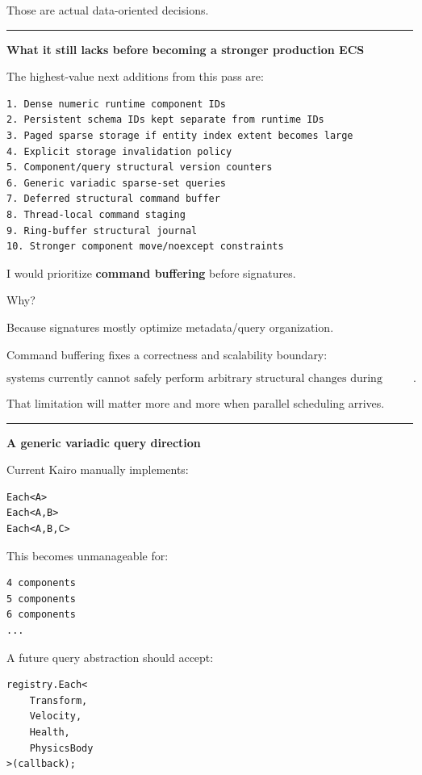 Those are actual data-oriented decisions.

\begin{center}\rule{0.5\linewidth}{0.5pt}\end{center}

\textbf{What it still lacks before becoming a stronger production ECS}

The highest-value next additions from this pass are:

\begin{verbatim}
1. Dense numeric runtime component IDs
2. Persistent schema IDs kept separate from runtime IDs
3. Paged sparse storage if entity index extent becomes large
4. Explicit storage invalidation policy
5. Component/query structural version counters
6. Generic variadic sparse-set queries
7. Deferred structural command buffer
8. Thread-local command staging
9. Ring-buffer structural journal
10. Stronger component move/noexcept constraints
\end{verbatim}

I would prioritize \textbf{command buffering} before signatures.

Why?

Because signatures mostly optimize metadata/query organization.

Command buffering fixes a correctness and scalability boundary:

\[
\boxed{
\text{systems currently cannot safely perform arbitrary structural changes during iteration}.
}
\]

That limitation will matter more and more when parallel scheduling arrives.

\begin{center}\rule{0.5\linewidth}{0.5pt}\end{center}

\textbf{A generic variadic query direction}

Current Kairo manually implements:

\begin{verbatim}
Each<A>
Each<A,B>
Each<A,B,C>
\end{verbatim}

This becomes unmanageable for:

\begin{verbatim}
4 components
5 components
6 components
...
\end{verbatim}

A future query abstraction should accept:

\begin{verbatim}
registry.Each<
    Transform,
    Velocity,
    Health,
    PhysicsBody
>(callback);
\end{verbatim}


